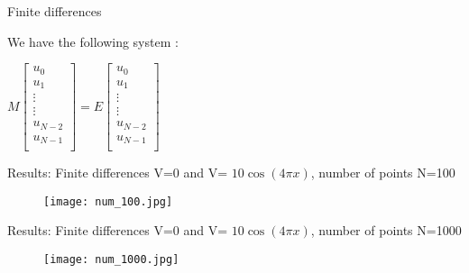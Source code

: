 \documentclass{beamer}
\begin{document}
\begin{frame}{Finite differences}

We have the following system :

$M  \begin{bmatrix}
u_0  \\
u_1  \\
\vdots   \\
\vdots  \\
u_{N-2}   \\
u_{N-1} \\
\end{bmatrix}
= E  \begin{bmatrix}
u_0  \\
u_1  \\
\vdots   \\
\vdots  \\
u_{N-2}   \\
u_{N-1} \\
\end{bmatrix}$

\end{frame}

\begin{frame}{Results: Finite differences }
V=0 and V= $10\cos(4 \pi x)$, number of points N=100

\begin{figure}
    \centering
    \texttt{[image: num\_100.jpg]} 
    \label{fig:my_label}
\end{figure}
\end{frame}


\begin{frame}{Results: Finite differences}
V=0 and V= $10\cos(4\pi x)$, number of points N=1000

\begin{figure}
    \centering
    \texttt{[image: num\_1000.jpg]} 
    \label{fig:my_label}
\end{figure}
\end{frame}
\end{document}
